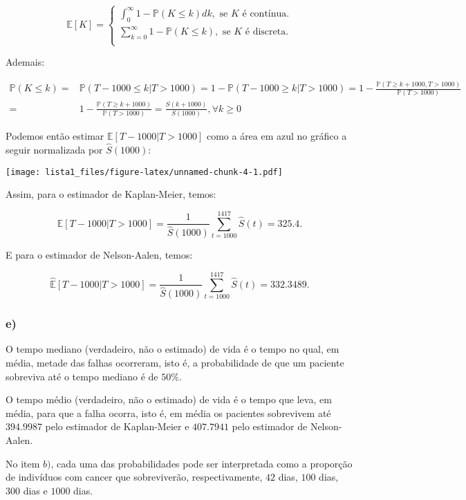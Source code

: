 \documentclass[
]{article}
\begin{document}
\[
\mathbb{E}[K]=\begin{cases}
\int_{0}^{\infty}1-\mathbb{P}(K \le k)dk,\text{ se }K\text{ é contínua}.\\
\sum_{k=0}^{\infty}1-\mathbb{P}(K \le k),\text{ se }K\text{ é discreta}.\\
\end{cases}
\]

Ademais:

\[
\begin{aligned}
\mathbb{P}(K \le k)=&\mathbb{P}(T-1000 \le k|T>1000)=1-\mathbb{P}(T-1000 \ge k|T>1000)=1-\frac{\mathbb{P}(T \ge k+1000, T>1000)}{\mathbb{P}(T>1000)}\\
=&1-\frac{\mathbb{P}(T \ge k+1000)}{\mathbb{P}(T>1000)}=\frac{S(k+1000)}{S(1000)}, \forall k\ge 0
\end{aligned}
\]

Podemos então estimar \(\mathbb{E}[T-1000|T>1000]\) como a área em azul
no gráfico a seguir normalizada por \(\widehat{S}(1000)\):

\texttt{[image: lista1\_files/figure-latex/unnamed-chunk-4-1.pdf]}

Assim, para o estimador de Kaplan-Meier, temos:

\[
\widehat{\mathbb{E}}[T-1000|T>1000]=\frac{1}{\widehat{S}(1000)}\sum_{t=1000}^{1417}\widehat{S}(t)=325.4.
\]

E para o estimador de Nelson-Aalen, temos:

\[
\widehat{\mathbb{E}}[T-1000|T>1000]=\frac{1}{\widehat{S}(1000)}\sum_{t=1000}^{1417}\widehat{S}(t)= 332.3489.
\]

\hypertarget{e}{%
\subsubsection{e)}\label{e}}

O tempo mediano (verdadeiro, não o estimado) de vida é o tempo no qual,
em média, metade das falhas ocorreram, isto é, a probabilidade de que um
paciente sobreviva até o tempo mediano é de \(50\%\).

O tempo médio (verdadeiro, não o estimado) de vida é o tempo que leva,
em média, para que a falha ocorra, isto é, em média os pacientes
sobrevivem até \(394.9987\) pelo estimador de Kaplan-Meier e
\(407.7941\) pelo estimador de Nelson-Aalen.

No item \(b)\), cada uma das probabilidades pode ser interpretada como a
proporção de indivíduos com cancer que sobreviverão, respectivamente,
\(42\) dias, \(100\) dias, \(300\) dias e \(1000\) dias.
\end{document}
